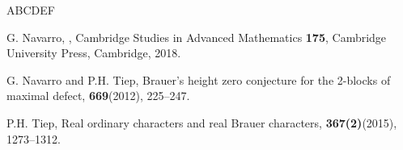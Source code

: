 \documentclass[10pt]{article}
\begin{document}
\begin{thebibliography}{ABCDEF}
  
   G. Navarro,
   ,
   \newblock Cambridge Studies in Advanced Mathematics {\bf 175}, Cambridge University Press, Cambridge, 2018.
   

 G. Navarro and P.H. Tiep,
\newblock Brauer's height zero conjecture for the 2-blocks of maximal defect,
 {\bf 669}(2012), 225--247.


   P.H. Tiep,
   \newblock Real ordinary characters and real Brauer characters,
    {\bf 367(2)}(2015), 1273--1312.







\end{thebibliography}
\end{document}

